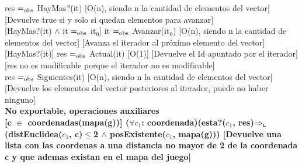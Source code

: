 {res $=_{\mathrm{obs}}$ HayMas?(it)}
[O(n), siendo n la cantidad de elementos del vector]
[Devuelve true si y solo si quedan elementos para avanzar]\\

[HayMas?(it) $\wedge$ it $=_{\mathrm{obs}}$ it$_0$]
{it $=_{\mathrm{obs}}$ Avanzar(it$_0$)}
[O(n), siendo n la cantidad de elementos del vector]
[Avanza el iterador al próximo elemento del vector]\\

[HayMas?(it)]
{res $=_{\mathrm{obs}}$ Actual(it)}
[O(1)]
[Devuelve el Id apuntado por el iterador]
[res no es modificable porque el iterador no es modificable]\\

{res $=_{\mathrm{obs}}$ Siguientes(it)}
[O(n), siendo n la cantidad de elementos del vector]
[Devuelve los elementos del vector posteriores al iterador, puede no haber ninguno]\\

\bf{No exportable, operaciones auxiliares}\\

[c $\in$ coordenadas(mapa(g))]
{($\forall c_1$: coordenada)(esta?($c_1$, res)$\Rightarrow_{\mathrm{\scriptscriptstyle{L}}}$(distEuclidea($c_1$, c)$\leq$2  $\wedge$ posExistente($c_1$, mapa(g)))}
[Devuelve una lista con las coordenas a una distancia no mayor de 2 de la coordenada c y que ademas existan en el mapa del juego]


